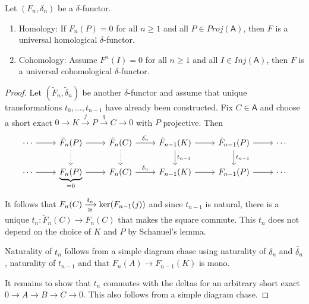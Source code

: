\documentclass[fontsize=11pt,fleqn,a4paper]{scrartcl}
\begin{document}
\begin{lemma}
Let $(F_n,\delta_n)$ be a $\delta$-functor.
\begin{multicols}{2}
\begin{enumerate}
\item Homology: If $F_n(P) = 0$ for all $n\geq 1$ and all $P\in Proj(\mathsf{A})$, then $F$ is a universal homological $\delta$-functor.
\item Cohomology: Assume $F^n(I) = 0$ for all $n\geq 1$ and all $I\in Inj(\mathsf{A})$, then $F$ is a universal cohomological $\delta$-functor.
\end{enumerate}
\end{multicols}
\end{lemma}
\begin{proof}
Let $(\tilde{F}_n,\tilde{\delta}_n)$ be another $\delta$-functor and assume that unique transformations $t_0,\ldots,t_{n-1}$ have already been constructed. Fix $C\in\mathsf{A}$ and choose a short exact $0\to K\xrightarrow{j} P \xrightarrow{q} C\to 0$ with $P$ projective. Then
\[\begin{tikzcd}
\cdots \ar[r] & \tilde{F}_n(P) \ar[r]\ar[d,dotted]  & \tilde{F}_n(C) \ar[r,"\tilde{\delta_n}"]\ar[d,dotted]  & \tilde{F}_{n-1}(K) \ar[r]\ar[d,"t_{n-1}"]  & \tilde{F}_{n-1}(P)\ar[d,"t_{n-1}"] \ar[r] & \cdots \\
\cdots \ar[r] & \underbrace{F_n(P)}_{=0} \ar[r] & F_n(C) \ar[r,"\delta_n"] & F_{n-1}(K) \ar[r] & F_{n-1}(P) \ar[r] & \cdots 
\end{tikzcd}\]
It follows that $F_n(C) \xrightarrow[\cong]{\delta_n} \ker(F_{n-1}(j))$ and since $t_{n-1}$ is natural, there is a unique $t_n: \tilde{F}_n(C) \to F_n(C)$ that makes the square commute. This $t_n$ does not depend on the choice of $K$ and $P$ by Schanuel's lemma.

Naturality of $t_n$ follows from a simple diagram chase using naturality of $\delta_n$ and $\tilde{\delta_n}$, naturality of $t_{n-1}$ and that $F_n(A) \to F_{n-1}(K)$ is mono.

It remains to show that $t_n$ commutes with the deltas for an arbitrary short exact $0\to A\to B\to C\to 0$. This also follows from a simple diagram chase.
\end{proof}
\end{document}
